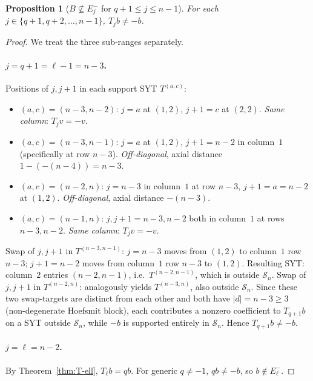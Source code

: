 \documentclass[11pt]{article}
\newtheorem{proposition}[theorem]{Proposition}
\theoremstyle{definition}
\begin{document}
\begin{proposition}[$B \not\subseteq E_j^-$ for $q+1 \le j \le n-1$]\label{prop:not-Ej-minus-higher}
For each $j \in \{q+1, q+2, \ldots, n-1\}$, $T_j b \ne -b$.
\end{proposition}

\begin{proof}
We treat the three sub-ranges separately.

\paragraph{$j = q + 1 = \ell - 1 = n - 3$.}  Positions of $j, j+1$ in
each support SYT $T^{(a,c)}$:
\begin{itemize}[topsep=0.3em,itemsep=0.1em]
\item $(a,c) = (n-3,n-2)$: $j = a$ at $(1,2)$, $j+1 = c$ at $(2,2)$.
  \emph{Same column}: $T_j v = -v$.
\item $(a,c) = (n-3,n-1)$: $j = a$ at $(1,2)$, $j+1 = n-2$ in column~$1$
  (specifically at row $n-3$).  \emph{Off-diagonal}, axial distance
  $1 - (-(n-4)) = n-3$.
\item $(a,c) = (n-2,n)$: $j = n-3$ in column~$1$ at row $n-3$,
  $j+1 = a = n-2$ at $(1,2)$.  \emph{Off-diagonal}, axial distance
  $-(n-3)$.
\item $(a,c) = (n-1,n)$: $j, j+1 = n-3, n-2$ both in column~$1$ at
  rows $n-3, n-2$.  \emph{Same column}: $T_j v = -v$.
\end{itemize}
Swap of $j, j+1$ in $T^{(n-3, n-1)}$: $j = n-3$ moves from $(1, 2)$
to column~$1$ row $n-3$; $j+1 = n-2$ moves from column~$1$ row $n-3$
to $(1, 2)$.  Resulting SYT: column~$2$ entries $(n-2, n-1)$, i.e.\
$T^{(n-2, n-1)}$, which is outside $\mathcal{S}_n$.
Swap of $j, j+1$ in $T^{(n-2, n)}$: analogously yields $T^{(n-3, n)}$,
also outside $\mathcal{S}_n$.  Since these two swap-targets are
distinct from each other and both have $|d| = n-3 \ge 3$
(non-degenerate Hoefsmit block), each contributes a nonzero
coefficient to $T_{q+1} b$ on a SYT outside $\mathcal{S}_n$, while
$-b$ is supported entirely in $\mathcal{S}_n$.  Hence $T_{q+1} b \ne -b$.

\paragraph{$j = \ell = n-2$.}  By Theorem~\ref{thm:T-ell}, $T_\ell b = q b$.
For generic $q \ne -1$, $qb \ne -b$, so $b \notin E_\ell^-$.


\end{proof}
\end{document}
